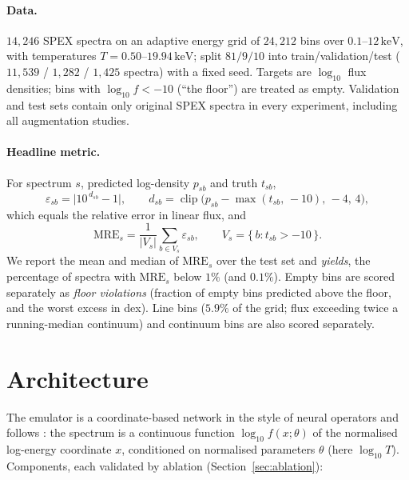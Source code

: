 \documentclass[11pt,a4paper]{article}
\newcommand{\mre}{\mathrm{MRE}}
\newcommand{\kev}{\,\mathrm{keV}}
\begin{document}
\paragraph{Data.} $14{,}246$ SPEX spectra on an adaptive energy grid of
$24{,}212$ bins over $0.1$--$12\kev$, with temperatures
$T = 0.50$--$19.94\kev$; split $81/9/10$ into train/validation/test
($11{,}539$ / $1{,}282$ / $1{,}425$ spectra) with a fixed seed. Targets
are $\log_{10}$ flux densities; bins with $\log_{10} f < -10$ (``the
floor'') are treated as empty. Validation and test sets contain only
original SPEX spectra in every experiment, including all augmentation
studies.

\paragraph{Headline metric.} For spectrum $s$, predicted log-density
$p_{sb}$ and truth $t_{sb}$,
\begin{equation}
\varepsilon_{sb} = \bigl|10^{\,d_{sb}} - 1\bigr|,\qquad
d_{sb} = \operatorname{clip}\bigl(p_{sb} - \max(t_{sb},\,-10),\,-4,\,4\bigr),
\label{eq:eps}
\end{equation}
which equals the relative error in linear flux, and
\begin{equation}
\mre_s = \frac{1}{|V_s|}\sum_{b\in V_s}\varepsilon_{sb},\qquad
V_s = \{\,b : t_{sb} > -10\,\}.
\label{eq:mre}
\end{equation}
We report the mean and median of $\mre_s$ over the test set and
\emph{yields}, the percentage of spectra with $\mre_s$ below $1\%$
(and $0.1\%$). Empty bins are scored separately as \emph{floor
violations} (fraction of empty bins predicted above the floor, and the
worst excess in dex). Line bins ($5.9\%$ of the grid; flux exceeding
twice a running-median continuum) and continuum bins are also scored
separately.

\section{Architecture}
\label{sec:arch}

The emulator is a coordinate-based network in the style of neural
operators \citep{lu21deeponet,li21fno} and follows
\citet{ricketts26}: the spectrum is a continuous function
$\log_{10} f(x;\theta)$ of the normalised log-energy coordinate $x$,
conditioned on normalised parameters $\theta$ (here $\log_{10} T$).
Components, each validated by ablation (Section~\ref{sec:ablation}):
\end{document}
